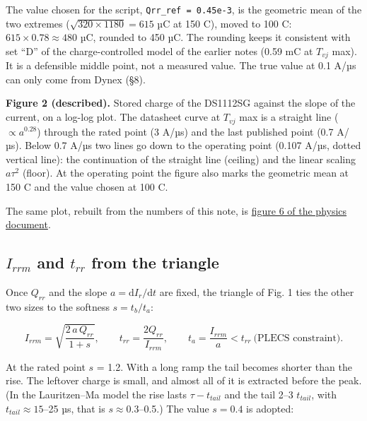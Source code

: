 \documentclass[11pt,a4paper,numbers=noenddot]{scrartcl}
\begin{document}
\begin{onehalfspace}
The value chosen for the script, \texttt{Qrr\_ref\ =\ 0.45e-3}, is the geometric mean of the two extremes (\(\sqrt{320 \times 1180} = 615\) µC at 150 \textdegree{}C), moved to 100 \textdegree{}C: \(615 \times 0.78 \approx 480\) µC, rounded to 450 µC. The rounding keeps it consistent with set ``D'' of the charge-controlled model of the earlier notes (0.59 mC at \(T_{vj}\) max). It is a defensible middle point, not a measured value. The true value at 0.1 A/µs can only come from Dynex (\S8).

\textbf{Figure 2 (described).} Stored charge of the DS1112SG against the slope of the current, on a log-log plot. The datasheet curve at \(T_{vj}\) max is a straight line (\(\propto a^{0.28}\)) through the rated point (3 A/µs) and the last published point (0.7 A/µs). Below 0.7 A/µs two lines go down to the operating point (0.107 A/µs, dotted vertical line): the continuation of the straight line (ceiling) and the linear scaling \(a\tau^2\) (floor). At the operating point the figure also marks the geometric mean at 150 \textdegree{}C and the value chosen at 100 \textdegree{}C.

\begin{mybox}
The same plot, rebuilt from the numbers of this note, is \href{https://github.com/pwr-control/Semiconductor-Physics-and-Devices/blob/main/diode-reverse-recovery/figures/fig6_qs_vs_didt.svg}{figure 6 of the physics document}.
\end{mybox}

\subsection{\texorpdfstring{\(I_{rrm}\) and \(t_{rr}\) from the triangle}{I\_\{rrm\} and t\_\{rr\} from the triangle}}\label{i_rrm-and-t_rr-from-the-triangle}

Once \(Q_{rr}\) and the slope \(a = \mathrm{d}I_r/\mathrm{d}t\) are fixed, the triangle of Fig. 1 ties the other two sizes to the softness \(s = t_b/t_a\):

\[I_{rrm} = \sqrt{\frac{2\,a\,Q_{rr}}{1+s}}, \qquad t_{rr} = \frac{2 Q_{rr}}{I_{rrm}}, \qquad t_a = \frac{I_{rrm}}{a} < t_{rr}\ \text{(PLECS constraint)}. \tag{5.3}\]

At the rated point \(s\) = 1.2. With a long ramp the tail becomes shorter than the rise. The leftover charge is small, and almost all of it is extracted before the peak. (In the Lauritzen--Ma model the rise lasts \(\tau - t_{tail}\) and the tail 2--3 \(t_{tail}\), with \(t_{tail} \approx 15\)--25 µs, that is \(s \approx 0.3\)--0.5.) The value \(s = 0.4\) is adopted:


\end{onehalfspace}
\end{document}
